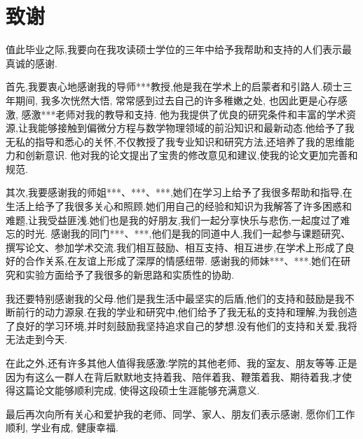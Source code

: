 \chapter{致谢}
值此毕业之际,我要向在我攻读硕士学位的三年中给予我帮助和支持的人们表示最真诚的感谢.

首先,我要衷心地感谢我的导师***教授,他是我在学术上的启蒙者和引路人.硕士三年期间, 我多次恍然大悟, 常常感到过去自己的许多稚嫩之处, 也因此更是心存感激, 感激***老师对我的教导和支持.
他为我提供了优良的研究条件和丰富的学术资源,让我能够接触到偏微分方程与数学物理领域的前沿知识和最新动态.他给予了我无私的指导和悉心的关怀,不仅教授了我专业知识和研究方法,还培养了我的思维能力和创新意识.
他对我的论文提出了宝贵的修改意见和建议,使我的论文更加完善和规范.

其次,我要感谢我的师姐***、***、***,她们在学习上给予了我很多帮助和指导,在生活上给予了我很多关心和照顾.她们用自己的经验和知识为我解答了许多困惑和难题,让我受益匪浅.她们也是我的好朋友,我们一起分享快乐与悲伤,一起度过了难忘的时光.
感谢我的同门***、***,他们是我的同道中人,我们一起参与课题研究、撰写论文、参加学术交流.我们相互鼓励、相互支持、相互进步,在学术上形成了良好的合作关系,在友谊上形成了深厚的情感纽带.
感谢我的师妹***、***.她们在研究和实验方面给予了我很多的新思路和实质性的协助.

我还要特别感谢我的父母.他们是我生活中最坚实的后盾,他们的支持和鼓励是我不断前行的动力源泉.在我的学业和研究中,他们给予了我无私的支持和理解,为我创造了良好的学习环境,并时刻鼓励我坚持追求自己的梦想.没有他们的支持和关爱,我将无法走到今天.

在此之外,还有许多其他人值得我感激:学院的其他老师、我的室友、朋友等等.正是因为有这么一群人在背后默默地支持着我、陪伴着我、鞭策着我、期待着我,才使得这篇论文能够顺利完成, 使得这段硕士生涯能够充满意义.

最后再次向所有关心和爱护我的老师、同学、家人、朋友们表示感谢, 愿你们工作顺利, 学业有成, 健康幸福.

